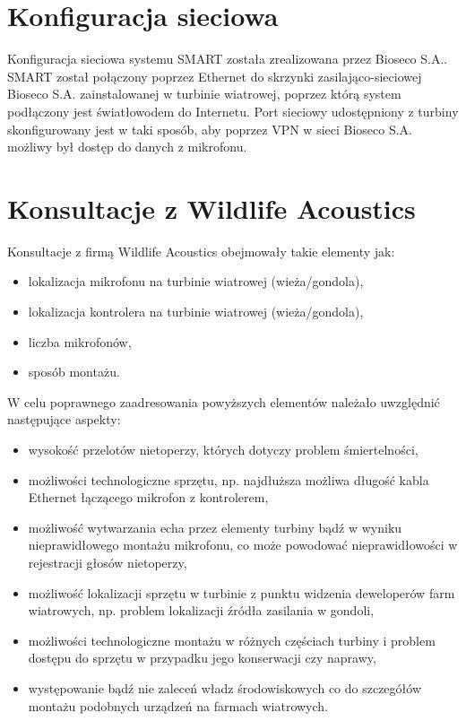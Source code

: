 \documentclass{sprz}
\begin{document}
\section{Konfiguracja sieciowa}
Konfiguracja sieciowa systemu SMART została zrealizowana przez Bioseco S.A.. SMART został połączony poprzez Ethernet do skrzynki zasilająco-sieciowej Bioseco S.A. zainstalowanej w turbinie wiatrowej, poprzez którą system podłączony jest światłowodem do Internetu. Port sieciowy udostępniony z turbiny skonfigurowany jest w taki sposób, aby poprzez VPN w sieci Bioseco S.A. możliwy był dostęp do danych z mikrofonu.

\section{Konsultacje z Wildlife Acoustics}
Konsultacje z firmą Wildlife Acoustics obejmowały takie elementy jak:
\begin{itemize}
  \item{lokalizacja mikrofonu na turbinie wiatrowej (wieża/gondola),}
  \item{lokalizacja kontrolera na turbinie wiatrowej (wieża/gondola),}
  \item{liczba mikrofonów,}
  \item{sposób montażu.}
\end{itemize}

W celu poprawnego zaadresowania powyższych elementów należało uwzględnić następujące aspekty:

\begin{itemize}
  \item{wysokość przelotów nietoperzy, których dotyczy problem śmiertelności,}
  \item{możliwości technologiczne sprzętu, np. najdłuższa możliwa długość kabla Ethernet łączącego mikrofon z kontrolerem,}
  \item{możliwość wytwarzania echa przez elementy turbiny bądź w wyniku nieprawidłowego montażu mikrofonu, co może powodować nieprawidłowości w rejestracji głosów nietoperzy,}
  \item{możliwość lokalizacji sprzętu w turbinie z punktu widzenia deweloperów farm wiatrowych, np. problem lokalizacji źródła zasilania w gondoli,}
  \item {możliwości technologiczne montażu w różnych częściach turbiny i problem dostępu do sprzętu w przypadku jego konserwacji czy naprawy,}
  \item {występowanie bądź nie zaleceń władz środowiskowych co do szczegółów montażu podobnych urządzeń na farmach wiatrowych.}
\end{itemize}
\end{document}

